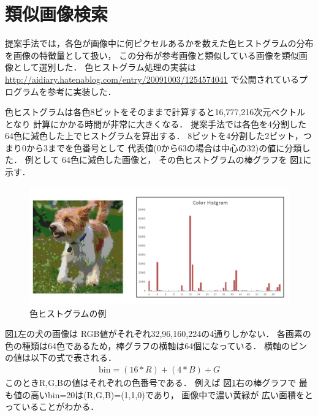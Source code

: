 \section{類似画像検索}
\label{sec:similar}


提案手法では，各色が画像中に何ピクセルあるかを数えた色ヒストグラムの分布を画像の特徴量として扱い，
この分布が参考画像と類似している画像を類似画像として選別した．
色ヒストグラム処理の実装は
\url{http://aidiary.hatenablog.com/entry/20091003/1254574041}
で公開されているプログラムを参考に実装した．

色ヒストグラムは各色8ビットをそのままで計算すると16,777,216次元ベクトルとなり
計算にかかる時間が非常に大きくなる．
提案手法では各色を4分割した64色に減色した上でヒストグラムを算出する．
8ビットを4分割した2ビット，つまり0から3までを色番号として
代表値(0から63の場合は中心の32)の値に分類した．
例として
64色に減色した画像と，
その色ヒストグラムの棒グラフを
図\ref{fig:color}に示す．
%
\begin{figure}[tb]
 \begin{center}
  \includegraphics[scale=0.50]{colorhist.jpg}
 \end{center}
 \caption{色ヒストグラムの例}
 \label{fig:color}
\end{figure}
%
%
図\ref{fig:color}左の犬の画像は
RGB値がそれぞれ32,96,160,224の4通りしかない．
各画素の色の種類は64色であるため，棒グラフの横軸は64個になっている．
横軸のビンの値は以下の式で表される．
\begin{eqnarray}
\mbox{bin} = (16 * R) + (4 * B) + G
\end{eqnarray}
このときR,G,Bの値はそれぞれの色番号である．
例えば
図\ref{fig:color}右の棒グラフで
最も値の高いbin=20は(R,G,B)=(1,1,0)であり，
画像中で濃い黄緑が
広い面積をとっていることがわかる．


